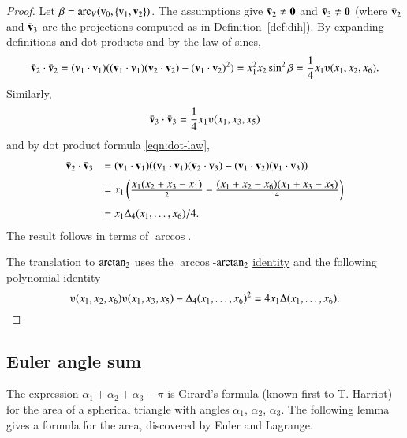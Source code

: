 \begin{proof}
Let $\beta = \operatorname{arc}_V({\mathbf v}_0,\{{\mathbf v}_1,{\mathbf v}_2\})$.
The assumptions give $\bar {{\mathbf v}}_2\ne {\mathbf 0}$ and 
$\bar {{\mathbf v}}_3 \ne {\mathbf 0}$ (where $\bar {{\mathbf v}}_2$ and
$\bar {{\mathbf v}}_3$ are the projections computed as in Definition~\ref{def:dih}).  
%
    By expanding definitions and dot products and by the \hyperref[lemma:los]{law} of sines,
    $$
    \bar \v_2\cdot \bar \v_2 = (\v_1\cdot \v_1) ((\v_1\cdot \v_1)(\v_2\cdot \v_2) -
    (\v_1\cdot \v_2)^2) =  x_1^2 x_2 \sin^2 \beta = \frac{1}{4}
    x_1
    \ups(x_1,x_2,x_6).
    $$
    Similarly,
    $$\bar \v_3 \cdot \bar \v_3 = \frac{1}{4} x_1 \ups(x_1,x_3,x_5)$$
and by dot product formula \eqref{eqn:dot-law},
    $$\begin{array}{lll}
    \bar \v_2\cdot \bar \v_3 &= (\v_1\cdot \v_1)((\v_1\cdot \v_1)(\v_2\cdot \v_3) -
    (\v_1\cdot \v_2)(\v_1\cdot \v_3) ) \vspace{6pt} \\  &
    = x_1 \left(\frac{\displaystyle x_1 (x_2 + x_3 -
    x_1)}{2} - \frac{\displaystyle (x_1 + x_2 - x_6)(x_1 + x_3 -
    x_5)}{4} \right)\vspace{6pt}\\&
    = {x_1\Delta_4(x_1,\ldots,x_6)}/{4}.
    \end{array}
    $$
The result follows in terms of $\arccos$.

The translation to ${\operatorname{arctan_2}}$ uses the $\arccos$-${\operatorname{arctan_2}}$ \hyperref[lemma:arccos-arctan]{identity}
and the following polynomial identity
    $$
    \ups(x_1,x_2,x_6)\ups(x_1,x_3,x_5) - \Delta_4(x_1,\ldots,x_6)^2
    = 4 x_1 \Delta(x_1,\ldots,x_6).
    $$
\end{proof}






\subsection{Euler angle sum}

The expression $\alpha_1+\alpha_2+\alpha_3-\pi$ is Girard's
formula (known first to T. Harriot) 
for the area of a spherical triangle with angles
$\alpha_1$, $\alpha_2$, $\alpha_3$.  The following lemma
gives a formula for the area, discovered by
Euler and Lagrange.
%
%
%
%
%

